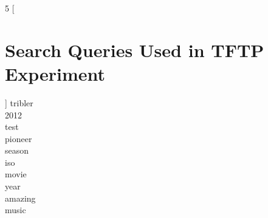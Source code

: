 \begin{multicols}{5}
	[
	\section{Search Queries Used in TFTP Experiment}
	]
	tribler\\
	2012\\
	test\\
	pioneer\\
	season\\
	iso\\
	movie\\
	year\\
	amazing\\
	music
\end{multicols}